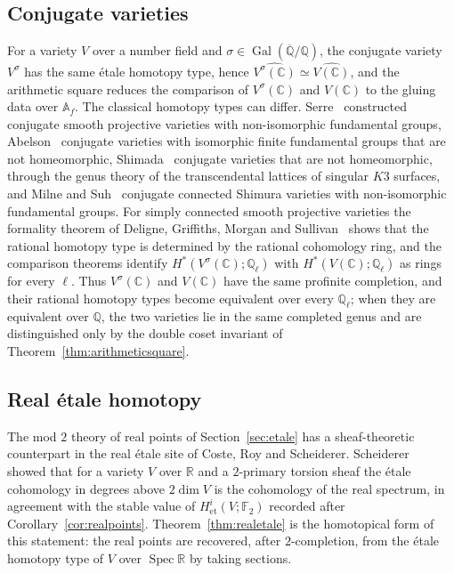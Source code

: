 \documentclass[11pt]{amsart}
\theoremstyle{plain}
\theoremstyle{definition}
\numberwithin{equation}{section}
\newcommand{\Q}{\mathbb{Q}}
\newcommand{\R}{\mathbb{R}}
\newcommand{\C}{\mathbb{C}}
\newcommand{\F}{\mathbb{F}}
\newcommand{\Af}{\mathbb{A}_f}
\newcommand{\Qbar}{\overline{\mathbb{Q}}}
\DeclareMathOperator{\Gal}{Gal}
\DeclareMathOperator{\Spec}{Spec}
\begin{document}
\subsection{Conjugate varieties}
For a variety $V$ over a number field and $\sigma\in\Gal(\Qbar/\Q)$, the conjugate variety $V^\sigma$ has the same \'etale homotopy type, hence $\widehat{V^\sigma(\C)}\simeq\widehat{V(\C)}$, and the arithmetic square reduces the comparison of $V^\sigma(\C)$ and $V(\C)$ to the gluing data over $\Af$.
The classical homotopy types can differ.
Serre~\cite{SerreConj} constructed conjugate smooth projective varieties with non-isomorphic fundamental groups, Abelson~\cite{Abelson} conjugate varieties with isomorphic finite fundamental groups that are not homeomorphic, Shimada~\cite{Shimada} conjugate varieties that are not homeomorphic, through the genus theory of the transcendental lattices of singular $K3$ surfaces, and Milne and Suh~\cite{MilneSuh} conjugate connected Shimura varieties with non-isomorphic fundamental groups.
For simply connected smooth projective varieties the formality theorem of Deligne, Griffiths, Morgan and Sullivan~\cite{DGMS} shows that the rational homotopy type is determined by the rational cohomology ring, and the comparison theorems identify $H^*(V^\sigma(\C);\Q_\ell)$ with $H^*(V(\C);\Q_\ell)$ as rings for every $\ell$.
Thus $V^\sigma(\C)$ and $V(\C)$ have the same profinite completion, and their rational homotopy types become equivalent over every $\Q_\ell$; when they are equivalent over $\Q$, the two varieties lie in the same completed genus and are distinguished only by the double coset invariant of Theorem~\ref{thm:arithmeticsquare}.

\subsection{Real \'etale homotopy}
The mod $2$ theory of real points of Section~\ref{sec:etale} has a sheaf-theoretic counterpart in the real \'etale site of Coste, Roy and Scheiderer.
Scheiderer~\cite{Scheiderer} showed that for a variety $V$ over $\R$ and a $2$-primary torsion sheaf the \'etale cohomology in degrees above $2\dim V$ is the cohomology of the real spectrum, in agreement with the stable value of $H^i_{\mathrm{et}}(V;\F_2)$ recorded after Corollary~\ref{cor:realpoints}.
Theorem~\ref{thm:realetale} is the homotopical form of this statement: the real points are recovered, after $2$-completion, from the \'etale homotopy type of $V$ over $\Spec\R$ by taking sections.
\end{document}
